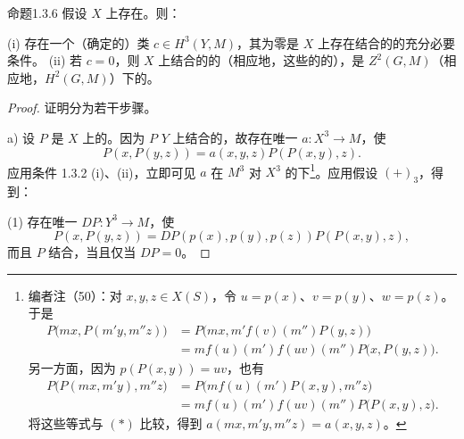 \begin{SGAresult}{命题}{1.3.6}
假设 $X$ 上存在。则：

(i) 存在一个（确定的）类 $c\in H^3(Y,M)$，其为零是 $X$ 上存在结合的的充分必要条件。
(ii) 若 $c=0$，则 $X$ 上结合的的（相应地，这些的的），是 $Z^2(G,M)$（相应地，$H^2(G,M)$）下的。
\end{SGAresult}
\begin{proof}
证明分为若干步骤。

 a) 设 $P$ 是 $X$ 上的。因为 $P$  $Y$ 上结合的，故存在唯一 $a:X^3\to M$，使
\[
 P(x,P(y,z))=a(x,y,z)P(P(x,y),z). \tag{*}
\]
应用条件 1.3.2 (i)、(ii)，立即可见 $a$ 在 $M^3$ 对 $X^3$ 的下\footnote{编者注（50）：对 $x,y,z\in X(S)$，令 $u=p(x)$、$v=p(y)$、$w=p(z)$。于是
\[
\begin{aligned}
P\bigl(mx,P(m'y,m''z)\bigr)
 &=P\bigl(mx,m'f(v)(m'')P(y,z)\bigr)\\
 &=mf(u)(m')f(uv)(m'')P\bigl(x,P(y,z)\bigr).
\end{aligned}
\]
另一方面，因为 $p(P(x,y))=uv$，也有
\[
\begin{aligned}
P\bigl(P(mx,m'y),m''z\bigr)
 &=P\bigl(mf(u)(m')P(x,y),m''z\bigr)\\
 &=mf(u)(m')f(uv)(m'')P\bigl(P(x,y),z\bigr).
\end{aligned}
\]
将这些等式与 $(*)$ 比较，得到 $a(mx,m'y,m''z)=a(x,y,z)$。}。应用假设 $(+)_3$，得到：

(1) 存在唯一 $DP:Y^3\to M$，使
\[
 P(x,P(y,z))=DP(p(x),p(y),p(z))P(P(x,y),z),
\]
而且 $P$ 结合，当且仅当 $DP=0$。


\end{proof}
